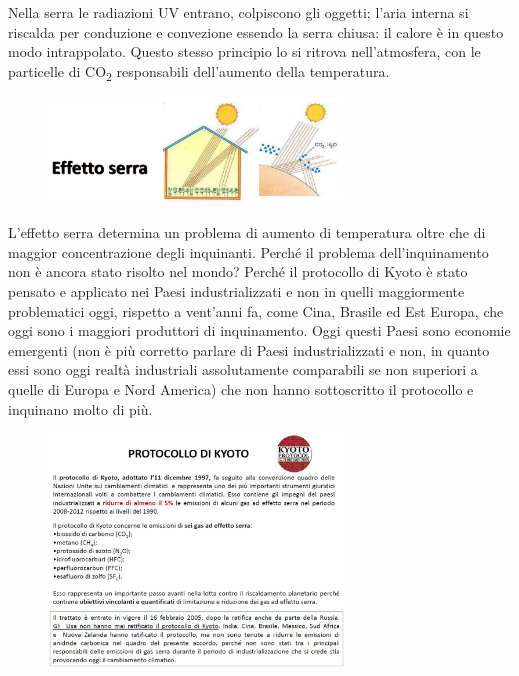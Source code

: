 Nella serra le radiazioni UV entrano, colpiscono gli oggetti; l'aria
interna si riscalda per conduzione e convezione essendo la serra chiusa:
il calore è in questo modo intrappolato. Questo stesso principio lo si
ritrova nell'atmosfera, con le particelle di CO\textsubscript{2}
responsabili dell'aumento della temperatura.

\begin{figure}[!ht]
\centering
	\includegraphics[width=0.7\textwidth]{23/image3.jpg}
	\end{figure}

L'effetto serra determina un problema di aumento di temperatura oltre
che di maggior concentrazione degli inquinanti. Perché il problema
dell'inquinamento non è ancora stato risolto nel mondo? Perché il
protocollo di Kyoto è stato pensato e applicato nei Paesi
industrializzati e non in quelli maggiormente problematici oggi,
rispetto a vent'anni fa, come Cina, Brasile ed Est Europa, che oggi sono
i maggiori produttori di inquinamento. Oggi questi Paesi sono economie
emergenti (non è più corretto parlare di Paesi industrializzati e non,
in quanto essi sono oggi realtà industriali assolutamente comparabili se
non superiori a quelle di Europa e Nord America) che non hanno
sottoscritto il protocollo e inquinano molto di più.

\begin{figure}[!ht]
\centering
	\includegraphics[width=0.7\textwidth]{23/image4.jpg}
	\end{figure}

